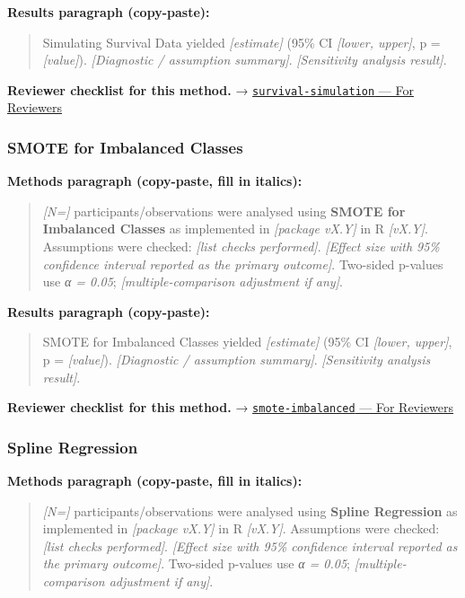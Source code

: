 \documentclass[
]{article}
\begin{document}
\textbf{Results paragraph (copy-paste):}

\begin{quote}
Simulating Survival Data yielded \emph{{[}estimate{]}} (95\% CI
\emph{{[}lower, upper{]}}, p = \emph{{[}value{]}}). \emph{{[}Diagnostic
/ assumption summary{]}}. \emph{{[}Sensitivity analysis result{]}}.
\end{quote}

\textbf{Reviewer checklist for this method.} →
\href{../chapters/11-survival/survival-simulation.Rmd\#for-reviewers}{\texttt{survival-simulation}
--- For Reviewers}

\subsubsection{SMOTE for Imbalanced
Classes}\label{smote-for-imbalanced-classes}

\textbf{Methods paragraph (copy-paste, fill in italics):}

\begin{quote}
\emph{{[}N={]}} participants/observations were analysed using
\textbf{SMOTE for Imbalanced Classes} as implemented in \emph{{[}package
vX.Y{]}} in R \emph{{[}vX.Y{]}}. Assumptions were checked: \emph{{[}list
checks performed{]}}. \emph{{[}Effect size with 95\% confidence interval
reported as the primary outcome{]}}. Two-sided p-values use \emph{α =
0.05}; \emph{{[}multiple-comparison adjustment if any{]}}.
\end{quote}

\textbf{Results paragraph (copy-paste):}

\begin{quote}
SMOTE for Imbalanced Classes yielded \emph{{[}estimate{]}} (95\% CI
\emph{{[}lower, upper{]}}, p = \emph{{[}value{]}}). \emph{{[}Diagnostic
/ assumption summary{]}}. \emph{{[}Sensitivity analysis result{]}}.
\end{quote}

\textbf{Reviewer checklist for this method.} →
\href{../chapters/13-ml/smote-imbalanced.Rmd\#for-reviewers}{\texttt{smote-imbalanced}
--- For Reviewers}

\subsubsection{Spline Regression}\label{spline-regression}

\textbf{Methods paragraph (copy-paste, fill in italics):}

\begin{quote}
\emph{{[}N={]}} participants/observations were analysed using
\textbf{Spline Regression} as implemented in \emph{{[}package vX.Y{]}}
in R \emph{{[}vX.Y{]}}. Assumptions were checked: \emph{{[}list checks
performed{]}}. \emph{{[}Effect size with 95\% confidence interval
reported as the primary outcome{]}}. Two-sided p-values use \emph{α =
0.05}; \emph{{[}multiple-comparison adjustment if any{]}}.
\end{quote}
\end{document}
